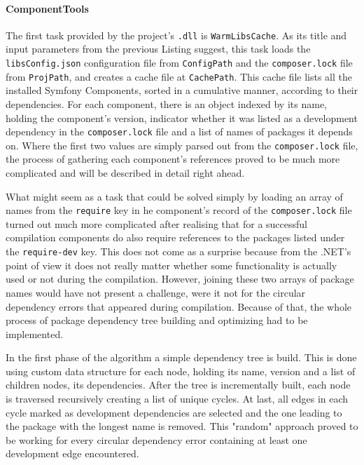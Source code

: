 \paragraph{ComponentTools} The first task provided by the project's \texttt{.dll} is \texttt{WarmLibsCache}. As its title and input parameters from the previous Listing suggest, this task loads the \texttt{libsConfig.json} configuration file from \texttt{ConfigPath} and the \texttt{composer.lock} file from \texttt{ProjPath}, and creates a cache file at \texttt{CachePath}. This cache file lists all the installed Symfony Components, sorted in a cumulative manner, according to their dependencies. For each component, there is an object indexed by its name, holding the component's version, indicator whether it was listed as a development dependency in the \texttt{composer.lock} file and a list of names of packages it depends on. Where the first two values are simply parsed out from the \texttt{composer.lock} file, the process of gathering each component's references proved to be much more complicated and will be described in detail right ahead.

What might seem as a task that could be solved simply by loading an array of names from the \texttt{require} key in he component's record of the \texttt{composer.lock} file turned out much more complicated after realising that for a successful compilation components do also require references to the packages listed under the \texttt{require-dev} key. This does not come as a surprise because from the .NET's point of view it does not really matter whether some functionality is actually used or not during the compilation. However, joining these two arrays of package names would have not present a challenge, were it not for the circular dependency errors that appeared during compilation. Because of that, the whole process of package dependency tree building and optimizing had to be implemented.

In the first phase of the algorithm a simple dependency tree is build. This is done using custom data structure for each node, holding its name, version and a list of children nodes, its dependencies. After the tree is incrementally built, each node is traversed recursively creating a list of unique cycles. At last, all edges in each cycle marked as development dependencies are selected and the one leading to the package with the longest name is removed. This "random" approach proved to be working for every circular dependency error containing at least one development edge encountered.

